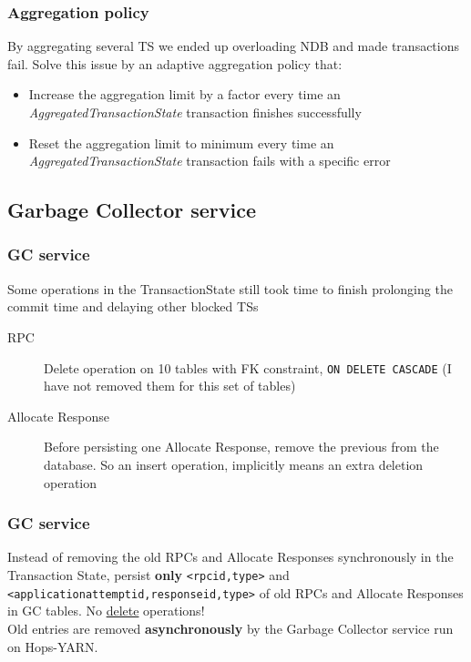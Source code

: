 \documentclass{beamer}
\begin{document}
\begin{frame}
\frametitle{Aggregation policy}
By aggregating several TS we ended up overloading NDB and made
transactions fail. Solve this issue by an adaptive aggregation policy
that:

\begin{itemize}
\item Increase the aggregation limit by a factor every time an
  \emph{AggregatedTransactionState} transaction finishes successfully
\item Reset the aggregation limit to minimum every time an
  \emph{AggregatedTransactionState} transaction fails with a specific error
\end{itemize}

\end{frame}
\subsection{Garbage Collector service}
\begin{frame}
\frametitle{GC service}

Some operations in the TransactionState still took time to finish
prolonging the commit time and delaying other blocked TSs

\begin{description}
\item[RPC] Delete operation on 10 tables with FK constraint,
  \texttt{ON DELETE CASCADE} (I have not removed them for this set of tables)
\item[Allocate Response] Before persisting one Allocate Response,
  remove the previous from the database. So an insert operation,
  implicitly means an extra deletion operation
\end{description}
\end{frame}

\begin{frame}
\frametitle{GC service}

Instead of removing the old RPCs and Allocate Responses synchronously
in the Transaction State, persist \textbf{only} \texttt{<rpcid,type>}
and \texttt{<applicationattemptid,responseid,type>} of old RPCs and
Allocate Responses in GC tables. No \underline{delete} operations!\\[2em]

Old entries are removed \textbf{asynchronously} by the Garbage Collector
service run on Hops-YARN.
\end{frame}
\end{document}
